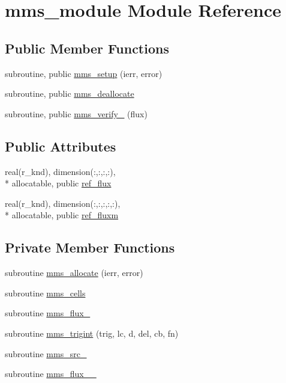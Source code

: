 \hypertarget{classmms__module}{\section{mms\-\_\-module Module Reference}
\label{classmms__module}
}
\subsection*{Public Member Functions}
\begin{DoxyCompactItemize}
\item 
subroutine, public \hyperlink{classmms__module_af6e2504f62297dcb69f3939549152fef}{mms\-\_\-setup} (ierr, error)
\item 
subroutine, public \hyperlink{classmms__module_ae6195b5333d8369babda3da8875a6f22}{mms\-\_\-deallocate}
\item 
subroutine, public \hyperlink{classmms__module_a37e1faf94ca3526af48c3e8efc1d332a}{mms\-\_\-verify\-\_} (flux)
\end{DoxyCompactItemize}
\subsection*{Public Attributes}
\begin{DoxyCompactItemize}
\item 
real(r\-\_\-knd), dimension(\-:,\-:,\-:,\-:), \\*
allocatable, public \hyperlink{classmms__module_a20157f9a49b1c0b449c340b7b1a63791}{ref\-\_\-flux}
\item 
real(r\-\_\-knd), dimension(\-:,\-:,\-:,\-:,\-:), \\*
allocatable, public \hyperlink{classmms__module_aaa592b5b9f1591e2a34df390563b0c56}{ref\-\_\-fluxm}
\end{DoxyCompactItemize}
\subsection*{Private Member Functions}
\begin{DoxyCompactItemize}
\item 
subroutine \hyperlink{classmms__module_ab75ca017795268e2e798920ed82058c0}{mms\-\_\-allocate} (ierr, error)
\item 
subroutine \hyperlink{classmms__module_a62f471d104fd6b83a9a0649115e4103e}{mms\-\_\-cells}
\item 
subroutine \hyperlink{classmms__module_a7182d71cc52a5cb7402d649bb17b0af9}{mms\-\_\-flux\-\_}
\item 
subroutine \hyperlink{classmms__module_a92298f4f6f9a03d54169aee15197f591}{mms\-\_\-trigint} (trig, lc, d, del, cb, fn)
\item 
subroutine \hyperlink{classmms__module_aa571bba8b81b30ec0d1560f2d6bd4e2a}{mms\-\_\-src\-\_}
\item 
subroutine \hyperlink{classmms__module_a8ed588a3dafe93834940e9df3460969b}{mms\-\_\-flux\-\_\-\_}
\end{DoxyCompactItemize}
